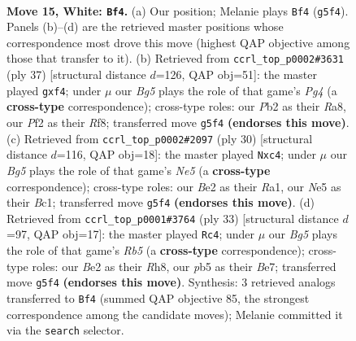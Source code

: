\documentclass[11pt]{article}
\begin{document}
\clearpage

\begin{figure}[p]\centering
\begin{subfigure}{0.46\textwidth}\centering
\resizebox{\linewidth}{!}{%
\newchessgame
\chessboard[
  setfen={rnbr1k2/5pb1/2p2np1/1p2N1Bp/p3P3/P1N5/RPP1BPPP/4RK2 w - - 2 15},
  showmover=false,
  pgfstyle=straightmove, color=movearrow, markmove={g5-f4}
]}
\caption{}
\end{subfigure}\hfill
\begin{subfigure}{0.46\textwidth}\centering
\resizebox{\linewidth}{!}{%
\newchessgame
\chessboard[
  setfen={r4rk1/pp3pbp/2pp4/4n1p1/NPPn1Nb1/2B3P1/P3PPBP/2RR1K2 b - - 1 19},
  showmover=false,
  pgfstyle=straightmove, color=movearrow, markmove={g5-f4}
]}
\caption{}
\end{subfigure}
\\[4pt]
\begin{subfigure}{0.46\textwidth}\centering
\resizebox{\linewidth}{!}{%
\newchessgame
\chessboard[
  setfen={r3k2r/1p2bpp1/2p1pn2/4Nb1p/p1nP3P/6P1/PP2PPB1/R1B2RK1 w kq - 0 16},
  showmover=false,
  pgfstyle=straightmove, color=movearrow, markmove={e5-c4}
]}
\caption{}
\end{subfigure}\hfill
\begin{subfigure}{0.46\textwidth}\centering
\resizebox{\linewidth}{!}{%
\newchessgame
\chessboard[
  setfen={4k2r/pp2bpp1/2p1pn1p/7b/nr2PB1P/PNN2P2/1P4P1/R2BK2R b KQk - 0 17},
  showmover=false,
  pgfstyle=straightmove, color=movearrow, markmove={b4-c4}
]}
\caption{}
\end{subfigure}
\caption{\textbf{Move 15, White: \texttt{Bf4}.} (a) Our position; Melanie plays \texttt{Bf4} (\texttt{g5f4}). Panels (b)--(d) are the retrieved master positions whose correspondence most drove this move (highest QAP objective among those that transfer to it). (b) Retrieved from \texttt{ccrl\_top\_p0002\#3631} (ply 37) [structural distance $d$=126, QAP obj=51]: the master played \texttt{gxf4}; under $\mu$ our \emph{Bg5} plays the role of that game's \emph{Pg4} (a \textbf{cross-type} correspondence); cross-type roles: our \emph{P}b2 as their \emph{R}a8, our \emph{P}f2 as their \emph{R}f8; transferred move \texttt{g5f4} \textbf{(endorses this move)}. (c) Retrieved from \texttt{ccrl\_top\_p0002\#2097} (ply 30) [structural distance $d$=116, QAP obj=18]: the master played \texttt{Nxc4}; under $\mu$ our \emph{Bg5} plays the role of that game's \emph{Ne5} (a \textbf{cross-type} correspondence); cross-type roles: our \emph{B}e2 as their \emph{R}a1, our \emph{N}e5 as their \emph{B}c1; transferred move \texttt{g5f4} \textbf{(endorses this move)}. (d) Retrieved from \texttt{ccrl\_top\_p0001\#3764} (ply 33) [structural distance $d$=97, QAP obj=17]: the master played \texttt{Rc4}; under $\mu$ our \emph{Bg5} plays the role of that game's \emph{Rb5} (a \textbf{cross-type} correspondence); cross-type roles: our \emph{B}e2 as their \emph{R}h8, our \emph{p}b5 as their \emph{B}e7; transferred move \texttt{g5f4} \textbf{(endorses this move)}. Synthesis: 3 retrieved analogs transferred to \texttt{Bf4} (summed QAP objective 85, the strongest correspondence among the candidate moves); Melanie committed it via the \texttt{search} selector.}
\label{fig:thought-m28}
\end{figure}
\end{document}
